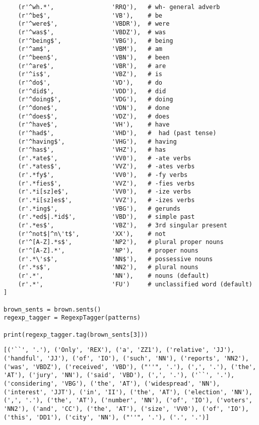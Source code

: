 \documentclass[man,12pt]{apa6}
\begin{document}
\begin{verbatim}
    (r'^wh.*',                'RRQ'),   # wh- general adverb
    (r'^be$',                 'VB'),    # be
    (r'^were$',               'VBDR'),  # were
    (r'^was$',                'VBDZ'),  # was
    (r'^being$',              'VBG'),   # being
    (r'^am$',                 'VBM'),   # am
    (r'^been$',               'VBN'),   # been
    (r'^are$',                'VBR'),   # are
    (r'^is$',                 'VBZ'),   # is
    (r'^do$',                 'VD'),    # do
    (r'^did$',                'VDD'),   # did
    (r'^doing$',              'VDG'),   # doing
    (r'^done$',               'VDN'),   # done
    (r'^does$',               'VDZ'),   # does
    (r'^have$',               'VH'),    # have
    (r'^had$',                'VHD'),   #  had (past tense)
    (r'^having$',             'VHG'),   # having
    (r'^has$',                'VHZ'),   # has
    (r'.*ate$',               'VV0'),   # -ate verbs
    (r'.*ates$',              'VVZ'),   # -ates verbs
    (r'.*fy$',                'VV0'),   # -fy verbs
    (r'.*fies$',              'VVZ'),   # -fies verbs
    (r'.*i[sz]e$',            'VV0'),   # -ize verbs
    (r'.*i[sz]es$',           'VVZ'),   # -izes verbs
    (r'.*ing$',               'VBG'),   # gerunds
    (r'.*ed$|.*id$',          'VBD'),   # simple past
    (r'.*es$',                'VBZ'),   # 3rd singular present
    (r'^not$|^n\'t$',         'XX'),    # not
    (r'^[A-Z].*s$',           'NP2'),   # plural proper nouns
    (r'^[A-Z].*',             'NP'),    # proper nouns
    (r'.*\'s$',               'NN$'),   # possessive nouns
    (r'.*s$',                 'NN2'),   # plural nouns
    (r'.*',                   'NN'),    # nouns (default)
    (r'.*',                   'FU')     # unclassified word (default)
]

brown_sents = brown.sents()
regexp_tagger = RegexpTagger(patterns)

print(regexp_tagger.tag(brown_sents[3]))
\end{verbatim}
\begin{verbatim}
[('``', '.'), ('Only', 'REX'), ('a', 'ZZ1'), ('relative', 'JJ'),
('handful', 'JJ'), ('of', 'IO'), ('such', 'NN'), ('reports', 'NN2'),
('was', 'VBDZ'), ('received', 'VBD'), ("''", '.'), (',', '.'), ('the',
'AT'), ('jury', 'NN'), ('said', 'VBD'), (',', '.'), ('``', '.'),
('considering', 'VBG'), ('the', 'AT'), ('widespread', 'NN'),
('interest', 'JJT'), ('in', 'II'), ('the', 'AT'), ('election', 'NN'),
(',', '.'), ('the', 'AT'), ('number', 'NN'), ('of', 'IO'), ('voters',
'NN2'), ('and', 'CC'), ('the', 'AT'), ('size', 'VV0'), ('of', 'IO'),
('this', 'DD1'), ('city', 'NN'), ("''", '.'), ('.', '.')]

\end{verbatim}
\end{document}
